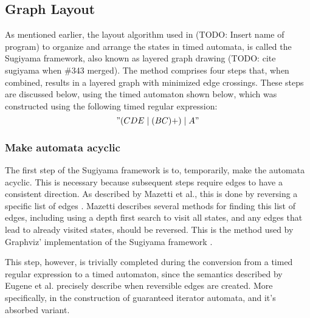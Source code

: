 \subsection{Graph Layout}\label{subsec:graph}





As mentioned earlier, the layout algorithm used in (TODO: Insert name of program) to organize and arrange the states in timed automata, is called the Sugiyama framework, also known as layered graph drawing (TODO: cite sugiyama when \#343 merged). The method comprises four steps that, when combined, results in a layered graph with minimized edge crossings. These steps are discussed below, using the timed automaton shown below, which was constructed using the following timed regular expression: $$"(CDE\mid(BC)+)\mid A"$$



\subsubsection{Make automata acyclic}
The first step of the Sugiyama framework is to, temporarily, make the automata acyclic. This is necessary because subsequent steps require edges to have a consistent direction. As described by Mazetti et al., this is done by reversing a specific list of edges \cite{Mazetti2012}.
Mazetti describes several methods for finding this list of edges, including using a depth first search to visit all states, and any edges that lead to already visited states, should be reversed.
This is the method used by Graphviz' implementation of the Sugiyama framework \cite{Graphviz}. %

This step, however, is trivially completed during the conversion from a timed regular expression to a timed automaton, since the semantics described by Eugene et al. precisely describe when reversible edges are created.
More specifically, in the construction of guaranteed iterator automata, and it's absorbed variant\cite{Eugene2001}.

